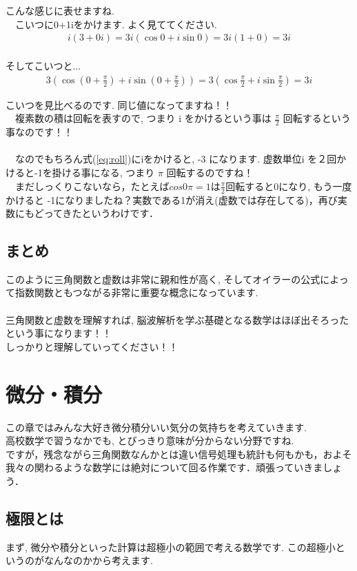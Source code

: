 \documentclass[11pt,a4paper]{ujreport}
\begin{document}
こんな感じに表せますね.\\
　こいつに0+1iをかけます. よく見ててください.
\begin{eqnarray}
i(3 + 0i) = 3i(\cos 0 + i\sin 0) = 3i(1+0) = 3i\\
\end{eqnarray}

そしてこいつと...
\begin{eqnarray}
3(\cos (0+\frac{\pi}{2}) + i\sin (0 + \frac{\pi}{2})) = 3(\cos\frac{\pi}{2} + i\sin\frac{\pi}{2}) = 3i
\label{eq:roll}
\end{eqnarray}

こいつを見比べるのです. 同じ値になってますね！！\\
　複素数の積は回転を表すので, つまり i をかけるという事は $\frac{\pi}{2}$ 回転するという事なのです！！\\
\\
　なのでもちろん式(\ref{eq:roll})にiをかけると, -3 になります. 虚数単位i を２回かけると-1を掛ける事になる, つまり $\pi$ 回転するのですね！\\
　まだしっくりこないなら，たとえば$cos0\pi = 1$は$\frac{\pi}{2}$回転すると0になり, もう一度かけると -1になりましたね？実数である1が消え(虚数では存在してる)，再び実数にもどってきたというわけです．
\section{まとめ}
このように三角関数と虚数は非常に親和性が高く, そしてオイラーの公式によって指数関数ともつながる非常に重要な概念になっています. \\
\\

三角関数と虚数を理解すれば, 脳波解析を学ぶ基礎となる数学はほぼ出そろったという事になります！！\\
しっかりと理解していってください！！\\

\chapter{微分・積分}
この章ではみんな大好き微分積分いい気分の気持ちを考えていきます.\\
高校数学で習うなかでも, とびっきり意味が分からない分野ですね.\\

ですが，残念ながら三角関数なんかとは違い信号処理も統計も何もかも，およそ我々の関わるような数学には絶対について回る作業です．頑張っていきましょう．
\section{極限とは}
まず, 微分や積分といった計算は超極小の範囲で考える数学です. この超極小というのがなんなのかから考えます.\\
\\
\end{document}
